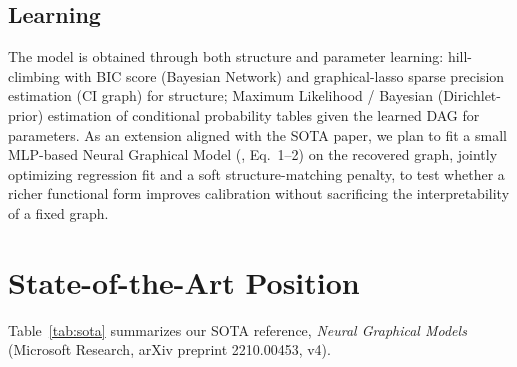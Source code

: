 \documentclass[conference]{IEEEtran}
\begin{document}
	\subsection{Learning}
	The model is obtained through both structure and parameter learning: hill-climbing with BIC score (Bayesian Network) and graphical-lasso sparse precision estimation (CI graph) for structure; Maximum Likelihood / Bayesian (Dirichlet-prior) estimation of conditional probability tables given the learned DAG for parameters. As an extension aligned with the SOTA paper, we plan to fit a small MLP-based Neural Graphical Model (\cite{ngm2022}, Eq.~1--2) on the recovered graph, jointly optimizing regression fit and a soft structure-matching penalty, to test whether a richer functional form improves calibration without sacrificing the interpretability of a fixed graph.
	
	\section{State-of-the-Art Position}
	\label{sec:sota}
	Table~\ref{tab:sota} summarizes our SOTA reference, \emph{Neural Graphical Models} \cite{ngm2022} (Microsoft Research, arXiv preprint 2210.00453, v4).
	
\end{document}
